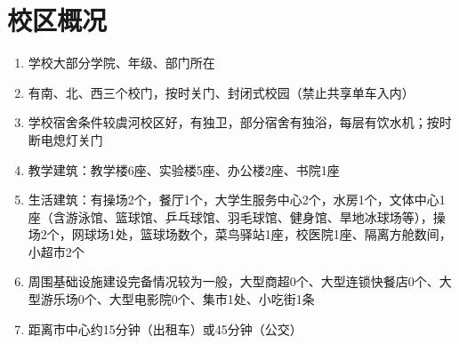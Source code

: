 \section*{校区概况}
\begin{enumerate}
    \item 学校大部分学院、年级、部门所在
    \item 有南、北、西三个校门，按时关门、封闭式校园\footnotemark （禁止共享单车入内）
    \item 学校宿舍条件较虞河校区好，有独卫，部分宿舍有独浴，每层有饮水机；按时断电熄灯关门
    \item 教学建筑：教学楼6座、实验楼5座、办公楼2座、书院1座
    \item 生活建筑：有操场2个，餐厅1个，大学生服务中心2个，水房1个，文体中心1座（含游泳馆、篮球馆、乒乓球馆、羽毛球馆、健身馆、旱地冰球场等），操场2个，网球场1处，篮球场数个，菜鸟驿站1座，校医院1座、隔离方舱数间，小超市2个
    \item 周围基础设施建设完备情况较为一般，大型商超0个、大型连锁快餐店0个、大型游乐场0个、大型电影院0个、集市1处、小吃街1条
    \item 距离市中心约15分钟（出租车）或45分钟（公交）
\end{enumerate}

